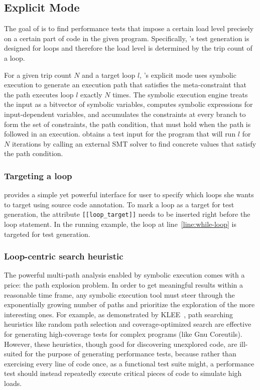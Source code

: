\subsection{Explicit Mode}
\label{sec:explicit-mode}

The goal of \lancet is to find performance tests that impose a certain load level precisely on a certain part of code in the given program. Specifically, \lancet's test generation is designed for loops and therefore the load level is determined by the trip count of a loop. 

For a given trip count $N$ and a target loop $l$, \lancet's explicit mode uses symbolic execution to generate an execution path that satisfies the meta-constraint that the path executes loop $l$ exactly $N$ times. The symbolic execution engine treats the input as a bitvector of symbolic variables, computes symbolic expressions for input-dependent variables, and accumulates the constraints at every branch to form the set of constraints, \ie the path condition, that must hold when the path is followed in an execution. \lancet obtains a test input for the program that will run $l$ for $N$ iterations by calling an external SMT solver to find concrete values that satisfy the path condition.

\subsubsection{Targeting a loop}
\label{sec:target-loop}

\lancet provides a simple yet powerful interface for user to specify which loops she wants to target using source code annotation. To mark a loop as a target for test generation, the attribute {\tt [[loop\_target]]} needs to be inserted right before the loop statement. In the running example, the loop at line~\ref{line:while-loop} is targeted for test generation.


\subsubsection{Loop-centric search heuristic}
\label{sec:loop-centric}

The powerful multi-path analysis enabled by symbolic execution comes with a price: the path explosion problem. In order to get meaningful results within a reasonable time frame, any symbolic execution tool must steer through the exponentially growing number of paths and prioritize the exploration of the more interesting ones. For example, as demonstrated by KLEE~\cite{klee}, path searching heuristics like random path selection and coverage-optimized search are effective for generating high-coverage tests for complex programs (like {\sc Gnu Coreutils}). However, these heuristics, though good for discovering unexplored code, are ill-suited for the purpose of generating performance tests, because rather than exercising every line of code once, as a functional test suite might, a performance test should instead repeatedly execute critical pieces of code to simulate high loads.

